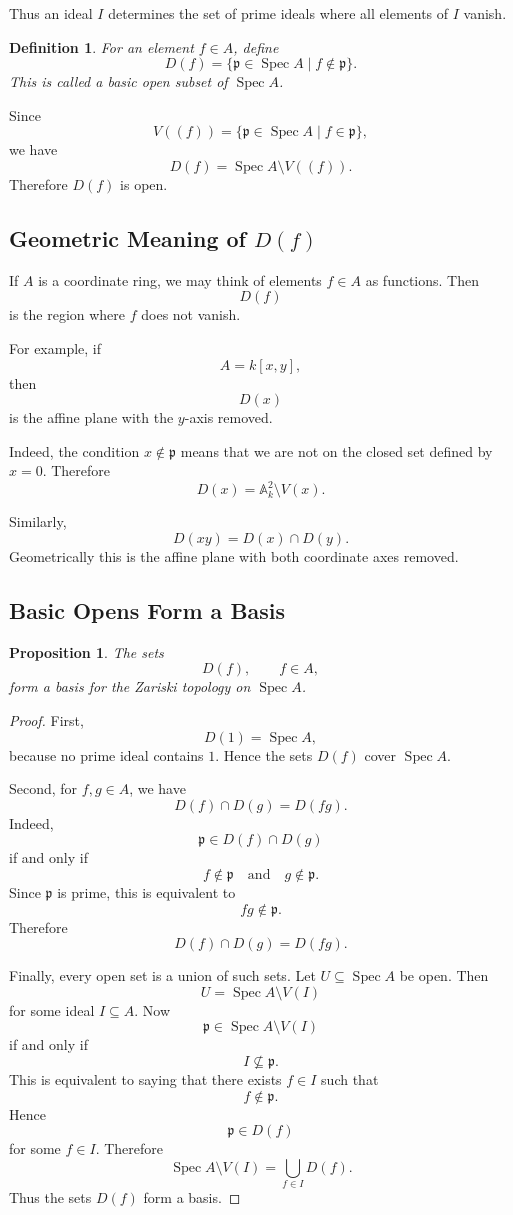 \documentclass[12pt,a4paper]{article}
\newtheorem{proposition}{Proposition}[section]
\newtheorem{definition}{Definition}[section]
\newcommand{\Spec}{\operatorname{Spec}}
\newcommand{\A}{\mathbb A}
\newcommand{\mfp}{\mathfrak p}
\begin{document}
Thus an ideal \(I\) determines the set of prime ideals where all elements of
\(I\) vanish.

\begin{definition}
	For an element \(f\in A\), define
	\[
	D(f)=\{\mfp\in \Spec A\mid f\notin \mfp\}.
	\]
	This is called a basic open subset of \(\Spec A\).
\end{definition}

Since
\[
V((f))=\{\mfp\in\Spec A\mid f\in\mfp\},
\]
we have
\[
D(f)=\Spec A\setminus V((f)).
\]
Therefore \(D(f)\) is open.

\subsection{Geometric Meaning of \(D(f)\)}

If \(A\) is a coordinate ring, we may think of elements \(f\in A\) as functions.
Then
\[
D(f)
\]
is the region where \(f\) does not vanish.

For example, if
\[
A=k[x,y],
\]
then
\[
D(x)
\]
is the affine plane with the \(y\)-axis removed.

Indeed, the condition \(x\notin\mfp\) means that we are not on the closed set
defined by \(x=0\). Therefore
\[
D(x)=\A^2_k\setminus V(x).
\]

Similarly,
\[
D(xy)=D(x)\cap D(y).
\]
Geometrically this is the affine plane with both coordinate axes removed.

\subsection{Basic Opens Form a Basis}

\begin{proposition}
	The sets
	\[
	D(f),\qquad f\in A,
	\]
	form a basis for the Zariski topology on \(\Spec A\).
\end{proposition}

\begin{proof}
	First,
	\[
	D(1)=\Spec A,
	\]
	because no prime ideal contains \(1\). Hence the sets \(D(f)\) cover
	\(\Spec A\).
	
	Second, for \(f,g\in A\), we have
	\[
	D(f)\cap D(g)=D(fg).
	\]
	Indeed,
	\[
	\mfp\in D(f)\cap D(g)
	\]
	if and only if
	\[
	f\notin\mfp
	\quad\text{and}\quad
	g\notin\mfp.
	\]
	Since \(\mfp\) is prime, this is equivalent to
	\[
	fg\notin\mfp.
	\]
	Therefore
	\[
	D(f)\cap D(g)=D(fg).
	\]
	
	Finally, every open set is a union of such sets. Let \(U\subseteq\Spec A\) be
	open. Then
	\[
	U=\Spec A\setminus V(I)
	\]
	for some ideal \(I\subseteq A\). Now
	\[
	\mfp\in \Spec A\setminus V(I)
	\]
	if and only if
	\[
	I\not\subseteq\mfp.
	\]
	This is equivalent to saying that there exists \(f\in I\) such that
	\[
	f\notin\mfp.
	\]
	Hence
	\[
	\mfp\in D(f)
	\]
	for some \(f\in I\). Therefore
	\[
	\Spec A\setminus V(I)=\bigcup_{f\in I}D(f).
	\]
	Thus the sets \(D(f)\) form a basis.
\end{proof}
\end{document}
